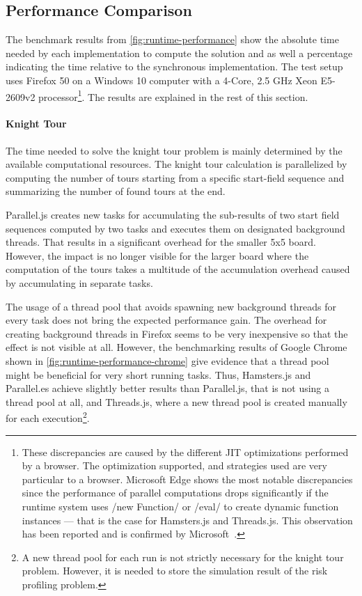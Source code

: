 \subsection{Performance Comparison}
The benchmark results from \cref{fig:runtime-performance} show the absolute time needed by each implementation to compute the solution and as well a percentage indicating the time relative to the synchronous implementation. The test setup uses Firefox 50 on a Windows 10 computer with a 4-Core, 2.5 GHz Xeon E5-2609v2 processor\footnote{These discrepancies are caused by the different JIT optimizations performed by a browser. The optimization supported, and strategies used are very particular to a browser. Microsoft Edge shows the most notable discrepancies since the performance of parallel computations drops significantly if the runtime system uses \javascriptinline/new Function/ or \javascriptinline/eval/ to create dynamic function instances --- that is the case for Hamsters.js and Threads.js. This observation has been reported and is confirmed by Microsoft~\cite{newFunctionWebWorkerEdge}.}. The results are explained in the rest of this section.

\begin{figure*}
		
	\caption{Runtime Performance of Parallelization Problems Relative to Synchronously Execution}
	\label{fig:runtime-performance}
\end{figure*}


\paragraph{Knight Tour} The time needed to solve the knight tour problem is mainly determined by the available computational resources. The knight tour calculation is parallelized by computing the number of tours starting from a specific start-field sequence and summarizing the  number of found tours at the end. 

Parallel.js creates new tasks for accumulating the sub-results of two start field sequences computed by two tasks and executes them on designated background threads. That results in a significant overhead for the smaller 5x5 board. However, the impact is no longer visible for the larger board where the computation of the tours takes a multitude of the accumulation overhead caused by accumulating in separate tasks.

The usage of a thread pool that avoids spawning new background threads for every task does not bring the expected performance gain. The overhead for creating background threads in Firefox seems to be very inexpensive so that the effect is not visible at all. However, the benchmarking results of Google Chrome shown in \cref{fig:runtime-performance-chrome} give evidence that a thread pool might be beneficial for very short running tasks. Thus, Hamsters.js and Parallel.es achieve slightly better results than Parallel.js, that is not using a thread pool at all, and Threads.js, where a new thread pool is created manually for each execution\footnote{A new thread pool for each run is not strictly necessary for the knight tour problem. However, it is needed to store the simulation result of the risk profiling problem.}. 

